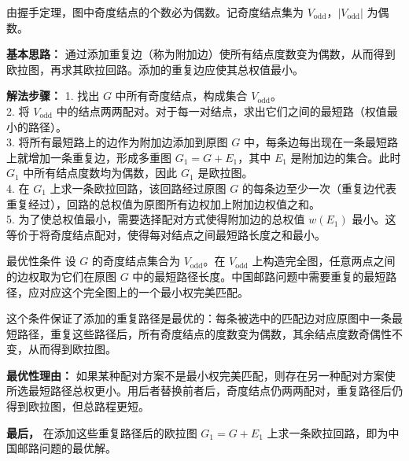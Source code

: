 由握手定理，图中奇度结点的个数必为偶数。记奇度结点集为 $V_{\text{odd}}$，$|V_{\text{odd}}|$ 为偶数。

\textbf{基本思路：} 通过添加重复边（称为附加边）使所有结点度数变为偶数，从而得到欧拉图，再求其欧拉回路。添加的重复边应使其总权值最小。

\textbf{解法步骤：}
1. 找出 $G$ 中所有奇度结点，构成集合 $V_{\text{odd}}$。\\
    2. 将 $V_{\text{odd}}$ 中的结点两两配对。对于每一对结点，求出它们之间的最短路（权值最小的路径）。\\
    3. 将所有最短路上的边作为附加边添加到原图 $G$ 中，每条边每出现在一条最短路上就增加一条重复边，形成多重图 $G_1 = G + E_1$，其中 $E_1$ 是附加边的集合。此时 $G_1$ 中所有结点度数均为偶数，因此 $G_1$ 是欧拉图。\\
    4. 在 $G_1$ 上求一条欧拉回路，该回路经过原图 $G$ 的每条边至少一次（重复边代表重复经过），回路的总权值为原图所有边权加上附加边权值之和。\\
    5. 为了使总权值最小，需要选择配对方式使得附加边的总权值 $w(E_1)$ 最小。这等价于将奇度结点配对，使得每对结点之间最短路长度之和最小。

\begin{theorem}{最优性条件}{}
    设 $G$ 的奇度结点集合为 $V_{\text{odd}}$。在 $V_{\text{odd}}$ 上构造完全图，任意两点之间的边权取为它们在原图 $G$ 中的最短路径长度。中国邮路问题中需要重复的最短路径，应对应这个完全图上的一个最小权完美匹配。
\end{theorem}
    这个条件保证了添加的重复路径是最优的：每条被选中的匹配边对应原图中一条最短路径，重复这些路径后，所有奇度结点的度数变为偶数，其余结点度数奇偶性不变，从而得到欧拉图。

    \textbf{最优性理由：}
    如果某种配对方案不是最小权完美匹配，则存在另一种配对方案使所选最短路径总权更小。用后者替换前者后，奇度结点仍两两配对，重复路径后仍得到欧拉图，但总路程更短。

    \textbf{最后，} 在添加这些重复路径后的欧拉图 $G_1 = G + E_1$ 上求一条欧拉回路，即为中国邮路问题的最优解。


